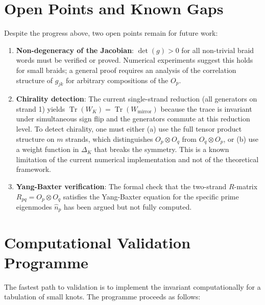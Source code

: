 \documentclass[11pt]{article}
\newcommand{\Tr}{\operatorname{Tr}}
\newcommand{\hatN}[1]{\hat{n}_{#1}}
\begin{document}
\section{Open Points and Known Gaps}
\label{sec:gaps}

Despite the progress above, two open points remain for future work:

\begin{enumerate}
  \item \textbf{Non-degeneracy of the Jacobian}: $\det(g)>0$ for all non-trivial braid words must be verified or proved. Numerical experiments suggest this holds for small braids; a general proof requires an analysis of the correlation structure of $g_{jk}$ for arbitrary compositions of the $O_p$.

  \item \textbf{Chirality detection}: The current single-strand reduction (all generators on strand 1) yields $\Tr(W_K)=\Tr(W_{\text{mirror}})$ because the trace is invariant under simultaneous sign flip and the generators commute at this reduction level. To detect chirality, one must either (a) use the full tensor product structure on $m$ strands, which distinguishes $O_p\otimes O_q$ from $O_q\otimes O_p$, or (b) use a weight function in $\Delta_K$ that breaks the symmetry. This is a known limitation of the current numerical implementation and not of the theoretical framework.

  \item \textbf{Yang-Baxter verification}: The formal check that the two-strand $R$-matrix $R_{pq}=O_p\otimes O_q$ satisfies the Yang-Baxter equation for the specific prime eigenmodes $\hatN{p}$ has been argued but not fully computed.
\end{enumerate}

\section{Computational Validation Programme}

The fastest path to validation is to implement the invariant computationally for a tabulation of small knots. The programme proceeds as follows:
\end{document}
